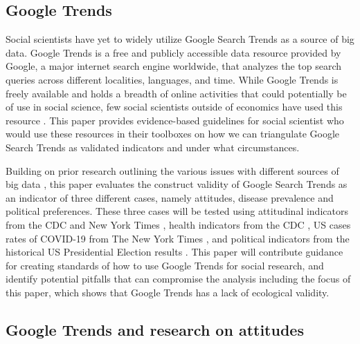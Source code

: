 \subsection{Google Trends}

Social scientists have yet to widely utilize Google Search Trends as a source of big data.
Google Trends is a free and publicly accessible data resource
provided by Google, a major internet search
engine worldwide, that analyzes the top search queries across different localities, 
languages, and time. While Google Trends is freely available and holds a breadth of 
online activities that could potentially be of use in social science, few social 
scientists outside of economics have used this resource \citep[see][for examples]{choi2012predicting, jun2018ten,da2011search}. This paper provides evidence-based guidelines for social scientist who would use these resources in their toolboxes on how we can triangulate Google Search Trends
as validated indicators and under what circumstances.

Building on prior research outlining the various issues with different sources of big data
\citep{boydCriticalQuestionsBig2012,lazerIssuesConstructValidity2015},
this paper evaluates the construct validity of Google Search Trends as an indicator of three different
cases, namely attitudes, disease prevalence and political preferences.
These three cases will be tested using attitudinal indicators from the %
CDC \citeyearpar{vaches_data} and New York Times \citeyearpar{mask_data}, 
health indicators from the CDC \citeyearpar{suic_data}, 
US cases rates of COVID-19 from The New York Times \citeyearpar{covid_data},  
and political indicators from the historical US Presidential Election results \citeyearpar{pres_data}.
This paper will contribute guidance for creating standards of how to use Google
Trends for social research, and identify potential pitfalls that can compromise the 
analysis including the focus of this paper, which shows that Google Trends has a
lack of ecological validity. 


\subsection{Google Trends and research on attitudes}


